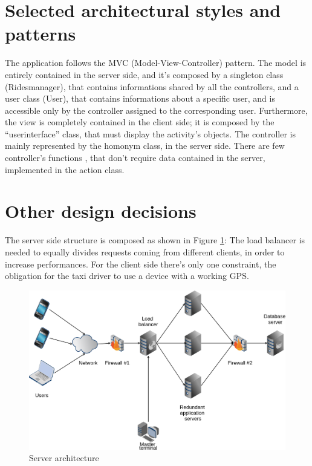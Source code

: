 \section{Selected architectural styles and patterns}
The application follows the MVC (Model-View-Controller) pattern.
The model is entirely contained in the server side, and it's composed by a singleton class (Ridesmanager), that contains 
informations shared by all the controllers, and a user class (User), that contains informations about a specific user, and is
accessible only by the controller assigned to the corresponding user.
Furthermore, the view is completely contained in the client side; it is composed by the ``userinterface'' class, that must display
the activity's objects.
The controller is mainly represented by the homonym class, in the server side. There are few controller's functions , that don't 
require data contained in the server, implemented in the action class.

\section{Other design decisions}
The server side structure is composed as shown in Figure \ref{fig:hwarch}:
The load balancer is needed to equally divides requests coming from different clients, in order to increase performances.
For the client side there's only one constraint, the obligation for the taxi driver to use a device with a working GPS.

\begin{figure} [h]
  \centering
  \includegraphics[scale=0.35]{../../architecture/architecture.png}
\caption{Server architecture \label{fig:hwarch}}
\end{figure}
